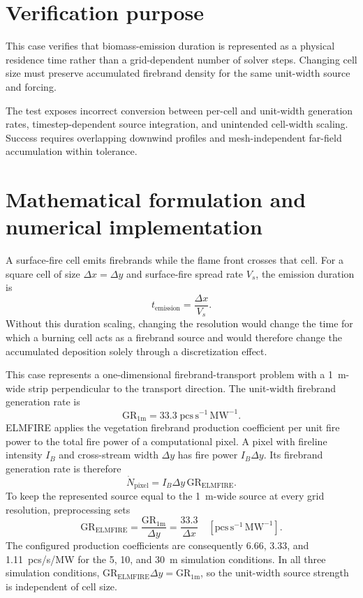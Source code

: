 \section{Verification purpose}

This case verifies that biomass-emission duration is represented as a physical residence time rather than a grid-dependent number of solver steps. Changing cell size must preserve accumulated firebrand density for the same unit-width source and forcing.

The test exposes incorrect conversion between per-cell and unit-width generation rates, timestep-dependent source integration, and unintended cell-width scaling. Success requires overlapping downwind profiles and mesh-independent far-field accumulation within tolerance.

\section{Mathematical formulation and numerical implementation}
A surface-fire cell emits firebrands while the flame front crosses that cell.
For a square cell of size $\Delta x=\Delta y$ and surface-fire spread rate
$V_s$, the emission duration is
\[
  t_{\mathrm{emission}}=\frac{\Delta x}{V_s}.
\]
Without this duration scaling, changing the resolution would change the time
for which a burning cell acts as a firebrand source and would therefore change
the accumulated deposition solely through a discretization effect.

This case represents a one-dimensional firebrand-transport problem with a
1~m-wide strip perpendicular to the transport direction. The unit-width
firebrand generation rate is
\[
  \mathrm{GR}_{1\mathrm{m}}=33.3\;\mathrm{pcs\,s^{-1}\,MW^{-1}}.
\]
ELMFIRE applies the vegetation firebrand production coefficient per unit fire power to the total fire power of
a computational pixel. A pixel with fireline intensity $I_B$ and cross-stream
width $\Delta y$ has fire power $I_B\Delta y$. Its firebrand generation rate
is therefore
\[
  \dot N_{\mathrm{pixel}}
  =I_B\Delta y\,\mathrm{GR}_{\mathrm{ELMFIRE}}.
\]
To keep the represented source equal to the 1~m-wide source at every grid
resolution, preprocessing sets
\[
  \mathrm{GR}_{\mathrm{ELMFIRE}}
  =\frac{\mathrm{GR}_{1\mathrm{m}}}{\Delta y}
  =\frac{33.3}{\Delta x}
  \quad [\mathrm{pcs\,s^{-1}\,MW^{-1}}].
\]
The configured production coefficients are consequently
6.66, 3.33, and 1.11~pcs/s/MW for the 5, 10, and 30~m simulation conditions. In all three
simulation conditions,
$\mathrm{GR}_{\mathrm{ELMFIRE}}\Delta y=\mathrm{GR}_{1\mathrm{m}}$, so the
unit-width source strength is independent of cell size.


